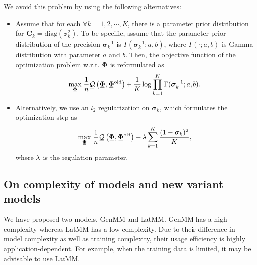 We avoid this problem by using the following alternatives:
\begin{itemize}[noitemsep, nolistsep]
\item Assume that for each $\forall k=1, 2, \cdots, K$, there is a parameter prior distribution for $\bm{C}_k=\mathrm{diag}(\bm{\sigma}_k^2)$.
  To be specific, assume that the parameter prior distribution of the precision $\bm{\sigma}_k^{-1}$ is
  $\Gamma(\bm{\sigma}_k^{-1};a, b)$, where $\Gamma(\cdot; a, b)$ is
  Gamma distribution with parameter $a$ and $b$. Then, the objective function of the optimization problem w.r.t. $\bm{\Phi}$ is reformulated as
  \begin{equation}\label{eq-latmm-obj1}
    \umax{ \ubar{\bm{\Phi}}}   \frac{1}{n}
    \ubar{\Qq}\left(\ubar{\bm{\Phi}},\ubar{\bm{\Phi}}^{\mathrm{old}} \right)
    +\frac{1}{K}
    \log\prod_{k=1}^K
    \Gamma(\bm{\sigma}_k^{-1};
    a, b).
  \end{equation}
\item Alternatively, we use an $l_2$ regularization on $\bm{\sigma}_k$,
  which formulates the optimization step as
  \begin{equation}
    \umax{\ubar{\bm{\Phi}}}   \frac{1}{n} \ubar{\Qq}\left(\ubar{\bm{\Phi}},\ubar{\bm{\Phi}}^{\mathrm{old}}\right)-\lambda \sum_{k=1}^K \frac{(1- \bm{\sigma}_k)^2}{K},
  \end{equation}
  where $\lambda$ is the regulation parameter.
\end{itemize}


\subsection{On complexity of models and new variant models}
We have proposed two models, GenMM and LatMM. GenMM has a high complexity whereas LatMM has a low complexity. Due to their difference in model complexity as well as training complexity, their usage efficiency is highly application-dependent. For example, when the training data is limited, it may be advisable to use LatMM.

